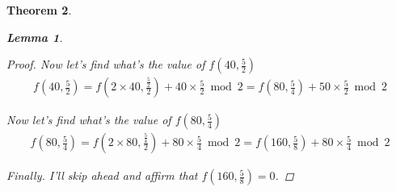 \documentclass{article}
\newtheorem{theorem}{Theorem}
\newtheorem{lemma}[theorem]{Lemma}
\begin{document}
\begin{theorem}
\begin{lemma}
\begin{proof}
Now let's find what's the value of $f(40, \frac{5}{2})$
\begin{align*}
    f(40, \frac{5}{2}) = f(2 \times 40, \frac{\frac{5}{2}}{2}) + 40 \times \frac{5}{2} \bmod{2} = f(80, \frac{5}{4}) + 50 \times \frac{5}{2} \bmod{2}
\end{align*}

Now let's find what's the value of $f(80, \frac{5}{4})$
\begin{align*}
    f(80, \frac{5}{4}) = f(2 \times 80, \frac{\frac{5}{4}}{2}) + 80 \times \frac{5}{4} \bmod{2} = f(160, \frac{5}{8}) + 80 \times \frac{5}{4} \bmod{2}
\end{align*}

Finally. I'll skip ahead and affirm that $f(160, \frac{5}{8}) = 0$.

\end{proof}

\end{lemma}

\end{theorem}
\end{document}
